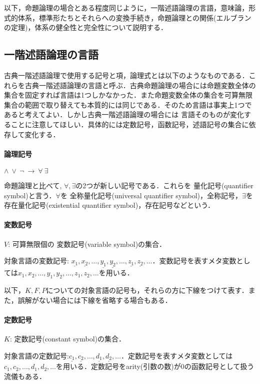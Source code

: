 \documentclass{ltjsarticle}
\theoremstyle{mystyle1}
\theoremstyle{mystyle2}
\newcommand{\red}[1]{{\color{red} #1}}
\begin{document}
以下，命題論理の場合とある程度同じように，一階述語論理の言語，意味論，形式的体系，標準形たちとそれらへの変換手続き，命題論理との関係(エルブランの定理)，体系の健全性と完全性について説明する．

\subsection{一階述語論理の言語}
古典一階述語論理で使用する記号と項，論理式とは以下のようなものである．これらを古典一階述語論理の言語と呼ぶ．古典命題論理の場合には命題変数全体の集合を固定すれば言語は1つしかなかった．また命題変数全体の集合を可算無限集合の範囲で取り替えても本質的には同じである．そのため言語は事実上1つであると考えてよい．しかし古典一階述語論理の場合には\red{言語そのものが変化する}ことに注意してほしい．具体的には定数記号，函数記号，述語記号の集合に依存して変化する．

\paragraph{論理記号}
$\wedge\ \vee\ \neg\ \to\ \forall\ \exists$

命題論理と比べて, $\forall,\exists$の2つが新しい記号である．これらを\red{量化記号}(quantifier symbol)と言う．$\forall$を\red{全称量化記号}(universal quantifier symbol)，全称記号，$\exists$を\red{存在量化記号}(existential quantifier symbol)，存在記号などという．

\paragraph{変数記号}
$V$: 可算無限個の\red{変数記号}(variable symbol)の集合．

対象言語の変数記号: $\underline{x_1},\underline{x_2},\ldots,\underline{y_1},\underline{y_2},\ldots,\underline{z_1},\underline{z_2},\ldots$．変数記号を表すメタ変数としては$x_1,x_2,\ldots,y_1,y_2,\ldots,z_1,z_2,\ldots$を用いる．

以下，$K, F, P$についての対象言語の記号も，それらの方に下線をつけて表す．また，誤解がない場合には下線を省略する場合もある．

\paragraph{定数記号}
$K$: \red{定数記号}(constant symbol)の集合．

対象言語の定数記号:$\underline{c_1},\underline{c_2},\ldots,\underline{d_1},\underline{d_2},\ldots$．定数記号を表すメタ変数としては$c_1,c_2,\ldots,d_1,d_2,\ldots$を用いる．定数記号をarity(引数の数)が0の函数記号として扱う流儀もある．
\end{document}
